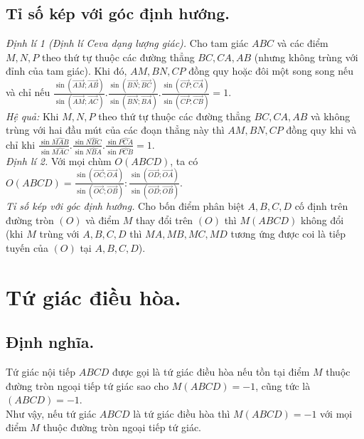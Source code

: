 \documentclass[12pt,a4paper]{article}
\begin{document}
\subsection{Tỉ số kép với góc định hướng.}
\textit{Định lí 1 (Định lí Ceva dạng lượng giác).} Cho tam giác \(ABC\) và các điểm \(M, N, P\) theo thứ tự thuộc các đường thẳng \(BC, CA, AB\) (nhưng không trùng với đỉnh của tam giác). Khi đó, \(AM, BN, CP\) đồng quy hoặc đôi một song song nếu và chỉ nếu \(\frac{{\sin \left( {\overrightarrow {AM} ;\overrightarrow {AB} } \right)}}{{\sin \left( {\overrightarrow {AM} ;\overrightarrow {AC} } \right)}}.\frac{{\sin \left( {\overrightarrow {BN} ;\overrightarrow {BC} } \right)}}{{\sin \left( {\overrightarrow {BN} ;\overrightarrow {BA} } \right)}}.\frac{{\sin \left( {\overrightarrow {CP} ;\overrightarrow {CA} } \right)}}{{\sin \left( {\overrightarrow {CP} ;\overrightarrow {CB} } \right)}} = 1.\)\\
\textit{Hệ quả:} Khi \(M, N, P\) theo thứ tự thuộc các đường thẳng \(BC, CA, AB\) và không trùng với hai đầu mút của các đoạn thẳng này thì \(AM, BN, CP\) đồng quy khi và chỉ khi \(\frac{{\sin \widehat {MAB}}}{{\sin \widehat {MAC}}}.\frac{{\sin \widehat {NBC}}}{{\sin \widehat {NBA}}}.\frac{{\sin \widehat {PCA}}}{{\sin \widehat {PCB}}} = 1.\)\\
\textit{Định lí 2.} Với mọi chùm \(O\left( {ABCD} \right)\), ta có \(O\left( {ABCD} \right) = \frac{{\sin \left( {\overrightarrow {OC} ;\overrightarrow {OA} } \right)}}{{\sin \left( {\overrightarrow {OC} ;\overrightarrow {OB} } \right)}}:\frac{{\sin \left( {\overrightarrow {OD} ;\overrightarrow {OA} } \right)}}{{\sin \left( {\overrightarrow {OD} ;\overrightarrow {OB} } \right)}}.\)\\
\textit{Tỉ số kép với góc định hướng.} Cho bốn điểm phân biệt \(A, B, C, D\) cố định trên đường tròn \(\left( O \right)\) và điểm \(M\) thay đổi trên \(\left( O \right)\) thì \(M\left( {ABCD} \right)\) không đổi (khi \(M\) trùng với \(A, B, C, D\) thì \(MA, MB, MC, MD\) tương ứng được coi là tiếp tuyến của \(\left( O \right)\) tại \(A, B, C, D\)). 
\newpage
\section{Tứ giác điều hòa.}
\subsection{Định nghĩa.} Tứ giác nội tiếp \(ABCD\) được gọi là tứ giác điều hòa nếu tồn tại điểm \(M\) thuộc đường tròn ngoại tiếp tứ giác sao cho \(M\left( {ABCD} \right) =  - 1\), cũng tức là \(\left( {ABCD} \right) =  - 1\).\\
Như vậy, nếu tứ giác \(ABCD\) là tứ giác điều hòa thì \(M\left( {ABCD} \right) =  - 1\) với mọi điểm \(M\) thuộc đường tròn ngoại tiếp tứ giác.
\end{document}
